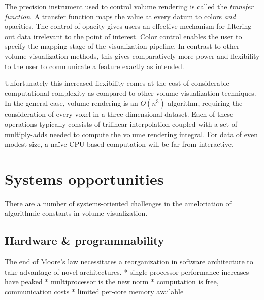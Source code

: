 
The precision instrument used to control volume rendering is called the
\emph{transfer function}.  A transfer function maps the value at every
datum to colors \emph{and} opacities.  The control of opacity gives
users an effective mechanism for filtering out data irrelevant to the
point of interest.  Color control enables the user to specify the
mapping stage of the visualization pipeline.  In contrast to other
volume visualization methods, this gives comparatively more power and
flexibility to the user to communicate a feature exactly as intended.

Unfortunately this increased flexibility comes at the cost of
considerable computational complexity as compared to other volume
visualization techniques.  In the general case, volume rendering is an
$O(n^3)$ algorithm, requiring the consideration of every voxel in a
three-dimensional dataset.  Each of these operations typically consists
of trilinear interpolation coupled with a set of multiply-adds needed
to compute the volume rendering integral.  For data of even modest
size, a na\"ive CPU-based computation will be far from interactive.



\section{Systems opportunities}

There are a number of systems-oriented challenges in the ameloriation of
algorithmic constants in volume visualization.

\subsection{Hardware \& programmability}

The end of Moore's law necessitates a reorganization in software architecture
to take advantage of novel architectures.
	* single processor performance increases have peaked
	* multiprocessor is the new norm
	* computation is free, communication costs
	* limited per-core memory available


